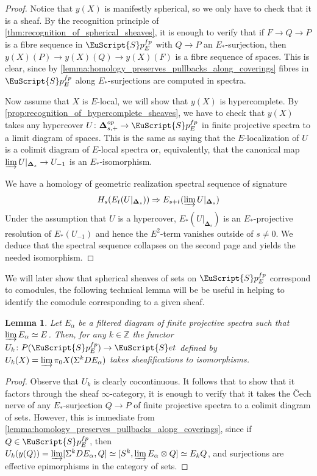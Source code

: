 \documentclass[oneside,a4paper]{amsart}
\newcommand{\euscr}[1]{\EuScript{#1}} %
\newcommand{\spectra}{\euscr{S}p} %
\newcommand{\sets}{\euscr{S}et} %
\newcommand{\spectrafp}{\spectra_{E}^{fp}} %
\newcommand{\thickdelta}{\mathbf{\Delta}} %
\theoremstyle{plain}
\newtheorem{lemma}[thm]{Lemma}
\theoremstyle{definition}
\theoremstyle{remark}
\begin{document}
\begin{proof}
Notice that $y(X)$ is manifestly spherical, so we only have to check that it is a sheaf. By the recognition principle of \cref{thm:recognition_of_spherical_sheaves}, it is enough to verify that if $F \rightarrow Q \rightarrow P$ is a fibre sequence in $\spectrafp$ with $Q \rightarrow P$ an $E_{*}$-surjection, then $y(X)(P) \rightarrow y(X)(Q) \rightarrow y(X)(F)$ is a fibre sequence of spaces. This is clear, since by \cref{lemma:homology_preserves_pullbacks_along_coverings} fibres in $\spectrafp$ along $E_{*}$-surjections are computed in spectra. 

Now assume that $X$ is $E$-local, we will show that $y(X)$ is hypercomplete. By \cref{prop:recognition_of_hypercomplete_sheaves}, we have to check that $y(X)$ takes any hypercover $U \colon \thickdelta_{s, +}^{op} \rightarrow \spectrafp$ in finite projective spectra to a limit diagram of spaces. This is the same as saying that the $E$-localization of $U$ is a colimit diagram of $E$-local spectra or, equivalently, that the canonical map $\varinjlim U |_{\thickdelta_{s}} \rightarrow U_{-1}$ is an $E_{*}$-isomorphism. 

We have a homology of geometric realization spectral sequence of signature 
\[
H_{s}(E_{t} (U |_{\thickdelta_{s}})) \Rightarrow E_{s+t}(\varinjlim U |_{\thickdelta_{s}})
\]
Under the assumption that $U$ is a hypercover, $E_{*} (U |_{\thickdelta_{s}})$ is an $E_{*}$-projective resolution of $E_{*}(U_{-1})$ and hence the $E^{2}$-term vanishes outside of $s \neq 0$. We deduce that the spectral sequence collapses on the second page and yields the needed isomorphism. 
\end{proof}

We will later show that spherical sheaves of sets on $\spectra_{E}^{fp}$ correspond to comodules, the following technical lemma will be be useful in helping to identify the comodule corresponding to a given sheaf.

\begin{lemma}
\label{lemma:homotopy_classes_of_maps_into_homotopy_e_modules_define_sheaves}
Let $E_{\alpha}$ be a filtered diagram of finite projective spectra such that $\varinjlim E_{\alpha} \simeq E$. Then, for any $k \in \mathbb{Z}$ the functor $U_{k} \colon P(\spectra_{E}^{fp}) \rightarrow \sets$ defined by $U_{k}(X) = \varinjlim \pi_{0} X(\Sigma^{k} DE_{\alpha})$ takes sheafifications to isomorphisms.
\end{lemma}

\begin{proof}
Observe that $U_{k}$ is clearly cocontinuous. It follows that to show that it factors through the sheaf $\infty$-category, it is enough to verify that it takes the \v{C}ech nerve of any $E_{*}$-surjection $Q \rightarrow P$ of finite projective spectra to a colimit diagram of sets. However, this is immediate from \cref{lemma:homology_preserves_pullbacks_along_coverings}, since if $Q \in \spectra_{E}^{fp}$, then $U_{k}(y(Q)) = \varinjlim [\Sigma^{k}DE_{\alpha}, Q] \simeq [S^{k}, \varinjlim E_{\alpha} \otimes Q] \simeq E_{k}Q$, and surjections are effective epimorphisms in the category of sets. 
\end{proof}
\end{document}
